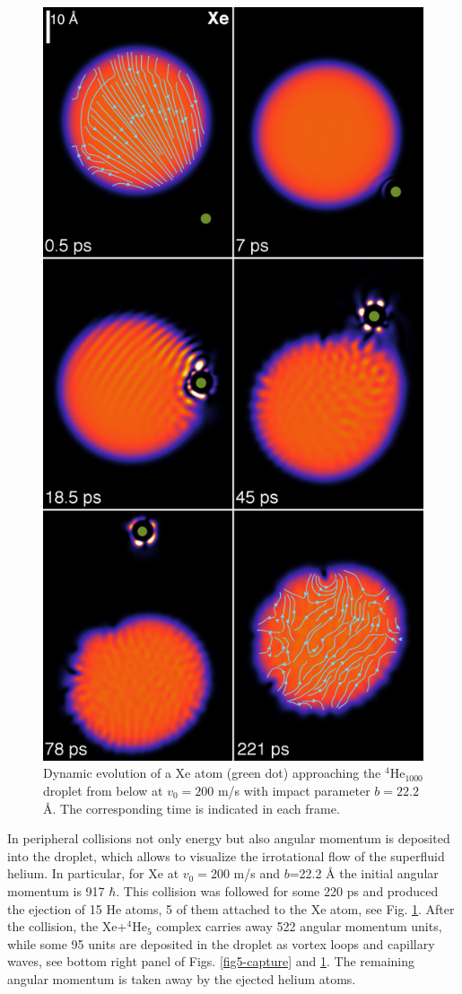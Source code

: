 \begin{figure}[h]
\centerline{\includegraphics[width=0.60\linewidth,clip]{xehe200-b222-composed}}
\caption{\label{fig6-capture} 
Dynamic evolution of a Xe atom (green dot) approaching the $^4$He$_{1000}$ 
droplet from below at $v_0 = 200$ m/s with impact parameter $b = 22.2$ \AA{}. The corresponding time is indicated in each frame.\citep{ESI}  
}
\end{figure}
%

In peripheral collisions not only energy but also angular momentum 
is deposited into the droplet, which allows  
to visualize the  irrotational flow of the superfluid helium.
In particular,
for Xe at $v_0=$200 m/s and $b$=22.2 \AA{} the initial angular momentum is 917 $\hbar$. 
This collision was followed for some 220 ps and
produced the ejection of 15 He atoms, 5 of them attached to the Xe atom, see Fig. \ref{fig6-capture}. 
After the collision, the Xe+$^4$He$_5$ complex carries away 522 
angular momentum units, while some 95 units are deposited in the droplet as vortex loops and
capillary waves,\citep{Whi98} see bottom right panel of Figs. \ref{fig5-capture} and \ref{fig6-capture}. 
The remaining angular momentum is taken away by the ejected helium atoms.

